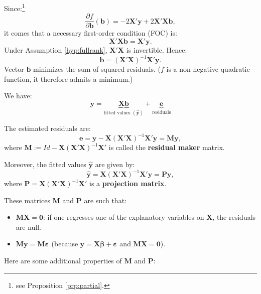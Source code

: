 \documentclass[
  12pt,
]{book}
\providecommand{\tightlist}{%
  \setlength{\itemsep}{0pt}\setlength{\parskip}{0pt}}
\theoremstyle{definition}
\theoremstyle{definition}
\theoremstyle{definition}
\theoremstyle{definition}
\theoremstyle{remark}
\begin{document}
Since:\footnote{see Proposition \ref{prp:partial}.}
\[
\frac{\partial f}{\partial \mathbf{b}}(\mathbf{b}) = - 2 \mathbf{X}'\mathbf{y} + 2 \mathbf{X}'\mathbf{X}\mathbf{b},
\]
it comes that a necessary first-order condition (FOC) is:
\begin{equation}
\mathbf{X}'\mathbf{X}\mathbf{b} = \mathbf{X}'\mathbf{y}.\label{eq:OLSFOC}
\end{equation}
Under Assumption \ref{hyp:fullrank}, \(\mathbf{X}'\mathbf{X}\) is invertible. Hence:
\[
\boxed{\mathbf{b} = (\mathbf{X}'\mathbf{X})^{-1} \mathbf{X}'\mathbf{y}.}
\]
Vector \(\mathbf{b}\) minimizes the sum of squared residuals. (\(f\) is a non-negative quadratic function, it therefore admits a minimum.)

We have:
\[
\mathbf{y} = \underbrace{\mathbf{X}\mathbf{b}}_{\mbox{fitted values } (\hat{\mathbf{y}})} + \underbrace{\mathbf{e}}_{\mbox{residuals}}
\]

The estimated residuals are:
\begin{equation}
\mathbf{e} = \mathbf{y} - \mathbf{X} (\mathbf{X}'\mathbf{X})^{-1} \mathbf{X}' \mathbf{y} = \mathbf{M} \mathbf{y},\label{eq:Mres}
\end{equation}
where \(\mathbf{M} := Id - \mathbf{X} (\mathbf{X}'\mathbf{X})^{-1} \mathbf{X}'\) is called the \textbf{residual maker} matrix.

Moreover, the fitted values \(\hat{\mathbf{y}}\) are given by:
\begin{equation}
\hat{\mathbf{y}}=\mathbf{X} (\mathbf{X}'\mathbf{X})^{-1} \mathbf{X}' \mathbf{y} = \mathbf{P} \mathbf{y},\label{eq:Proj}
\end{equation}
where \(\mathbf{P}=\mathbf{X} (\mathbf{X}'\mathbf{X})^{-1} \mathbf{X}'\) is a \textbf{projection matrix}.

These matrices \(\mathbf{M}\) and \(\mathbf{P}\) are such that:

\begin{itemize}
\tightlist
\item
  \(\mathbf{M} \mathbf{X} = \mathbf{0}\): if one regresses one of the explanatory variables on \(\mathbf{X}\), the residuals are null.
\item
  \(\mathbf{M}\mathbf{y}=\mathbf{M}\boldsymbol\varepsilon\) (because \(\mathbf{y} = \mathbf{X}\boldsymbol\beta + \boldsymbol\varepsilon\) and \(\mathbf{M} \mathbf{X} = \mathbf{0}\)).
\end{itemize}

Here are some additional properties of \(\mathbf{M}\) and \(\mathbf{P}\):
\end{document}
